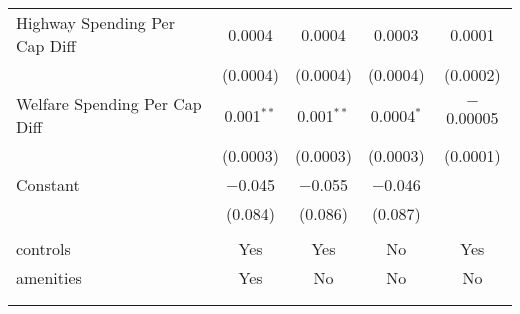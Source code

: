 \begin{table}[!htbp]
\begin{tabular}{@{\extracolsep{5pt}}lcccc}
  Highway Spending Per Cap Diff & 0.0004 & 0.0004 & 0.0003 & 0.0001 \\ 
  & (0.0004) & (0.0004) & (0.0004) & (0.0002) \\ 
  Welfare Spending Per Cap Diff & 0.001$^{**}$ & 0.001$^{**}$ & 0.0004$^{*}$ & $-$0.00005 \\ 
  & (0.0003) & (0.0003) & (0.0003) & (0.0001) \\ 
  Constant & $-$0.045 & $-$0.055 & $-$0.046 &  \\ 
  & (0.084) & (0.086) & (0.087) &  \\ 
 \hline \\[-1.8ex] 
controls & Yes & Yes & No & Yes \\ 
amenities & Yes & No & No & No \\ 
\hline \\[-1.8ex] 
\hline 
\hline \\[-1.8ex] 
\end{tabular} 
\end{table} 
